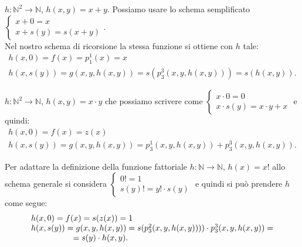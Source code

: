 \begin{esempio}[somma]
$h:\mathbb{N}^2 \to \mathbb{N}$, $h(x,y)=x+y$.
Possiamo usare lo schema semplificato
$\left\{ \begin{array}{ll}
	x+0=x\\
	x+s(y)=s(x+y)
\end{array}\right.$.\\
Nel nostro schema di ricorsione la stessa funzione si ottiene con $h$
tale:\newline
$$\begin{array}{ll}
	h(x,0)=f(x)=p_1^1(x)=x\\
	h(x,s(y))=g(x,y,h(x,y))=s(p_3^3(x,y,h(x,y)))=s(h(x,y)).
\end{array}$$\newline
\end{esempio}
%
\begin{esempio}[prodotto]

 $h:\mathbb{N}^2 \to \mathbb{N}$, $h(x,y)=x \cdot y$ che possiamo scrivere
come
$\left\{ \begin{array}{ll}
	x \cdot 0=0\\
	x \cdot s(y)= x \cdot y + x
\end{array}\right.$ e quindi: \newline
$$\begin{array}{ll}
	h(x,0)=f(x)=z(x)\\
	h(x,s(y))=g(x,y,h(x,y))=p_3^1(x,y,h(x,y))+p_3^3(x,y,h(x,y)).
\end{array}$$\newline
\end{esempio}
%
\begin{esempio}[fattoriale] Per adattare la definizione della funzione
fattoriale
$h:\mathbb{N} \to \mathbb{N}$, $h(x)=x!$ allo schema generale si considera
$\left\{ \begin{array}{ll}
	0!=1\\
	s(y)! = y! \cdot s(y)
\end{array}\right.$ e quindi si pu\`o prendere $h$ come segue: \newline
$$\begin{array}{ll}
	h(x,0)=f(x)=s(z(x))=1\\
	h(x,s(y))=g(x,y,h(x,y))= s(p_3^2(x,y,h(x,y)))) \cdot p_3^3(x,y,h(x,y))=
\\
	\hspace{1.8cm} = s(y)\cdot h(x,y).
	\end{array}$$\newline
\end{esempio}
